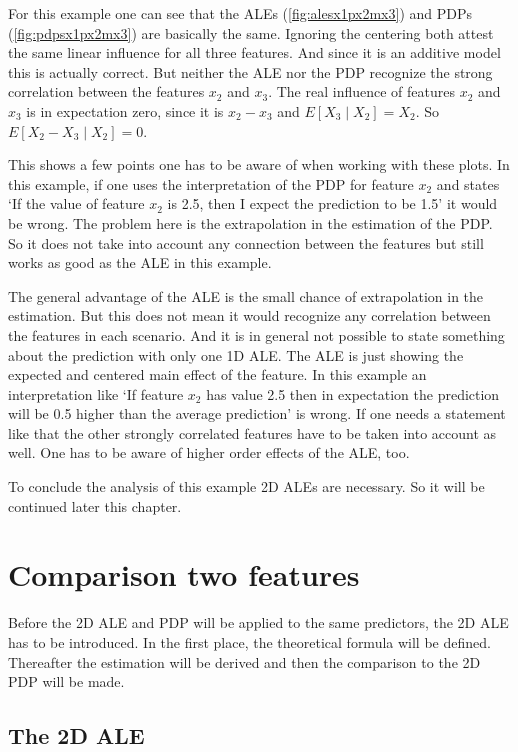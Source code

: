 \documentclass[
]{krantz}
\begin{document}
For this example one can see that the ALEs (\ref{fig:alesx1px2mx3}) and PDPs (\ref{fig:pdpsx1px2mx3}) are basically the same. Ignoring the centering both attest the same linear influence for all three features. And since it is an additive model this is actually correct. But neither the ALE nor the PDP recognize the strong correlation between the features \(x_2\) and \(x_3\). The real influence of features \(x_2\) and \(x_3\) is in expectation zero, since it is \(x_2 - x_3\) and \(E[X_3 \mid X_2] = X_2\). So \(E[X_2 - X_3 \mid X_2] = 0\).

This shows a few points one has to be aware of when working with these plots.
In this example, if one uses the interpretation of the PDP for feature \(x_2\) and states `If the value of feature \(x_2\) is 2.5, then I expect the prediction to be 1.5' it would be wrong. The problem here is the extrapolation in the estimation of the PDP. So it does not take into account any connection between the features but still works as good as the ALE in this example.

The general advantage of the ALE is the small chance of extrapolation in the estimation. But this does not mean it would recognize any correlation between the features in each scenario. And it is in general not possible to state something about the prediction with only one 1D ALE. The ALE is just showing the expected and centered main effect of the feature. In this example an interpretation like `If feature \(x_2\) has value 2.5 then in expectation the prediction will be 0.5 higher than the average prediction' is wrong. If one needs a statement like that the other strongly correlated features have to be taken into account as well. One has to be aware of higher order effects of the ALE, too.

To conclude the analysis of this example 2D ALEs are necessary. So it will be continued later this chapter.

\hypertarget{comparison-two-features}{%
\section{Comparison two features}\label{comparison-two-features}}

Before the 2D ALE and PDP will be applied to the same predictors, the 2D ALE has to be introduced. In the first place, the theoretical formula will be defined. Thereafter the estimation will be derived and then the comparison to the 2D PDP will be made.

\hypertarget{the-2d-ale}{%
\subsection{The 2D ALE}\label{the-2d-ale}}
\end{document}
